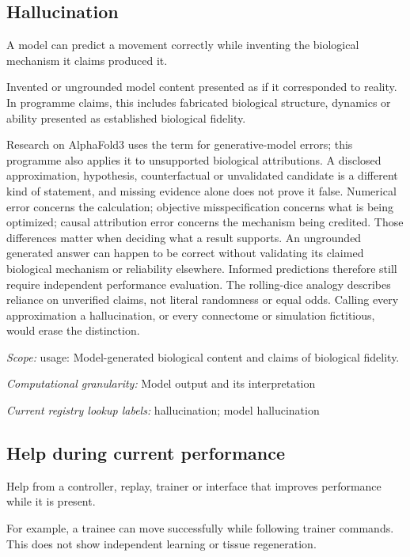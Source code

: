\begin{samepage}
\subsection*{Hallucination}
\noindent A model can predict a movement correctly while inventing the biological mechanism it claims produced it.\par
\end{samepage}
\noindent Invented or ungrounded model content presented as if it corresponded to reality. In programme claims, this includes fabricated biological structure, dynamics or ability presented as established biological fidelity.\par
\noindent Research on AlphaFold3 uses the term for generative-model errors; this programme also applies it to unsupported biological attributions. A disclosed approximation, hypothesis, counterfactual or unvalidated candidate is a different kind of statement, and missing evidence alone does not prove it false. Numerical error concerns the calculation; objective misspecification concerns what is being optimized; causal attribution error concerns the mechanism being credited. Those differences matter when deciding what a result supports. An ungrounded generated answer can happen to be correct without validating its claimed biological mechanism or reliability elsewhere. Informed predictions therefore still require independent performance evaluation. The rolling-dice analogy describes reliance on unverified claims, not literal randomness or equal odds. Calling every approximation a hallucination, or every connectome or simulation fictitious, would erase the distinction.\par
\noindent\textit{Scope:} usage: Model-generated biological content and claims of biological fidelity.\par
\begin{samepage}
\noindent\textit{Computational granularity:} Model output and its interpretation\par\nopagebreak[4]

\end{samepage}


\noindent\textit{Current registry lookup labels:} hallucination; model hallucination\par

\subsection*{Help during current performance}
\noindent Help from a controller, replay, trainer or interface that improves performance while it is present.\par
\noindent For example, a trainee can move successfully while following trainer commands. This does not show independent learning or tissue regeneration.\par

